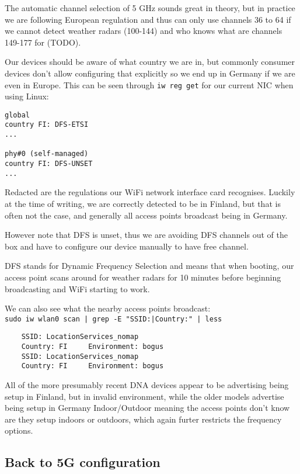 \documentclass[../wifi-security.tex]{subfiles}
\begin{document}
The automatic channel selection of 5 GHz sounds great in theory, but in practice we are following European regulation and thus can only use channels 36 to 64 if we cannot detect weather radars (100-144) \autocite{metisdfs} and who knows what are channels 149-177 for (TODO).

Our devices should be aware of what country we are in, but commonly consumer devices don't allow configuring that explicitly so we end up in Germany if we are even in Europe. This can be seen through \texttt{iw reg get} for our current NIC when using Linux:

\begin{verbatim}
global
country FI: DFS-ETSI
...

phy#0 (self-managed)
country FI: DFS-UNSET
...
\end{verbatim}

Redacted are the regulations our WiFi network interface card recognises. Luckily at the time of writing, we are correctly detected to be in Finland, but that is often not the case, and generally all access points broadcast being in Germany.

However note that DFS is unset, thus we are avoiding DFS channels out of the box and have to configure our device manually to have free channel.

DFS stands for Dynamic Frequency Selection and means that when booting, our access point scans around for weather radars for 10 minutes before beginning broadcasting and WiFi starting to work.

We can also see what the nearby access points broadcast:\\ \texttt{sudo iw wlan0 scan | grep -E "SSID:|Country:" | less}

\begin{verbatim}
	SSID: LocationServices_nomap
	Country: FI     Environment: bogus
	SSID: LocationServices_nomap
	Country: FI     Environment: bogus
\end{verbatim}

All of the more presumably recent DNA devices appear to be advertising being setup in Finland, but in invalid environment, while the older models advertise being setup in Germany Indoor/Outdoor meaning the access points don't know are they setup indoors or outdoors, which again furter restricts the frequency options.

\subsection{Back to 5G configuration}
\end{document}
